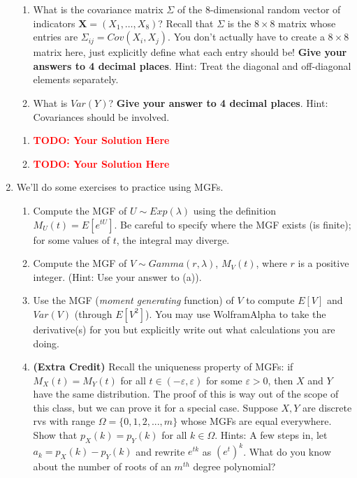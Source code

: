 \documentclass[12pt]{article}
\def\todo#1{\textcolor{red}{\textbf{#1}}}
\renewcommand{\|}{\mid}
\begin{document}
\begin{enumerate}
\begin{enumerate}
    \item What is the covariance matrix $\Sigma$ of the $8$-dimensional random vector of indicators $\mathbf{X}=(X_1,\dots,X_{8})$? Recall that $\Sigma$ is the $8\times 8$ matrix whose entries are $\Sigma_{ij}=Cov(X_i,X_j)$. You don't actually have to create a $8\times 8$ matrix here, just explicitly define what each entry should be! \textbf{Give your answers to 4 decimal places}. Hint: Treat the diagonal and off-diagonal elements separately. 
    \item What is $Var(Y)$? \textbf{Give your answer to 4 decimal places}. Hint: Covariances should be involved. 
\end{enumerate}

\begin{tcolorbox}
\begin{enumerate}
\item \todo{TODO: Your Solution Here}
\item \todo{TODO: Your Solution Here}
\end{enumerate}
\end{tcolorbox}

\item We'll do some exercises to practice using MGFs.
\begin{enumerate}
    \item Compute the MGF of $U\sim Exp(\lambda)$ using the definition $M_U(t)=E[e^{tU}]$. Be careful to specify where the MGF exists (is finite); for some values of $t$, the integral may diverge.
    \item Compute the MGF of $V\sim Gamma(r,\lambda)$, $M_V(t)$, where $r$ is a positive integer. (Hint: Use your answer to (a)).
    \item Use the MGF (\textit{moment generating} function) of $V$ to compute $E[V]$ and $Var(V)$ (through $E[V^2]$). You may use WolframAlpha to take the derivative(s) for you but explicitly write out what calculations you are doing.
    \item \textbf{(Extra Credit)} Recall the uniqueness property of MGFs: if $M_X(t)=M_Y(t)$ for all $t\in(-\varepsilon,\varepsilon)$ for some $\varepsilon>0$, then $X$ and $Y$ have the same distribution. The proof of this is way out of the scope of this class, but we can prove it for a special case. Suppose $X,Y$ are discrete rvs with range $\Omega=\{0,1,2,...,m\}$ whose MGFs are equal everywhere. Show that $p_X(k)=p_Y(k)$ for all $k\in\Omega$. Hints: A few steps in, let $a_k=p_X(k)-p_Y(k)$ and rewrite $e^{tk}$ as $(e^t)^k$. What do you know about the number of roots of an $m^{th}$ degree polynomial?
\end{enumerate}


\end{enumerate}
\end{document}
